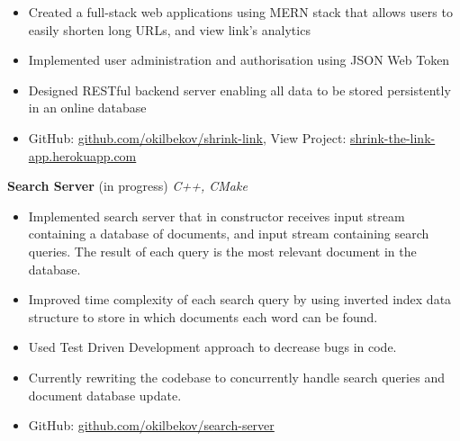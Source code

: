 \documentclass[a4paper]{article}
\begin{document}
\begin{itemize} \itemsep 1pt
	\item Created a full-stack web applications using MERN stack that allows users to easily shorten long URLs, and view link's analytics
	\vspace{-2mm}
	\item Implemented user administration and authorisation using JSON Web Token
	\vspace{-2mm}
	\item Designed RESTful backend server enabling all data to be stored persistently in an online database
	\vspace{-2mm}
	\item GitHub: \href{https://github.com/okilbekov/shrink-link}{github.com/okilbekov/shrink-link}, View Project: \href{https://shrink-the-link-app.herokuapp.com}{shrink-the-link-app.herokuapp.com}
\end{itemize}
{\textbf{Search Server}} (in progress) {\sl C++, CMake} \\
\vspace{-2mm}
\begin{itemize} \itemsep 1pt
	\item Implemented search server that in constructor receives input stream containing a database of documents, and input stream containing search queries. The result of each query is the most relevant document in the database.
	\vspace{-2mm}
	\item Improved time complexity of each search query by using inverted index data structure to store in which documents each word can be found.
	\vspace{-2mm}
	\item  Used Test Driven Development approach to decrease bugs in code.
	\vspace{-2mm}
	\item Currently rewriting the codebase to concurrently handle search queries and document database update.
	\vspace{-2mm}
	\item GitHub: \href{https://github.com/okilbekov/search-server}{github.com/okilbekov/search-server}
\end{itemize}
\end{document}
